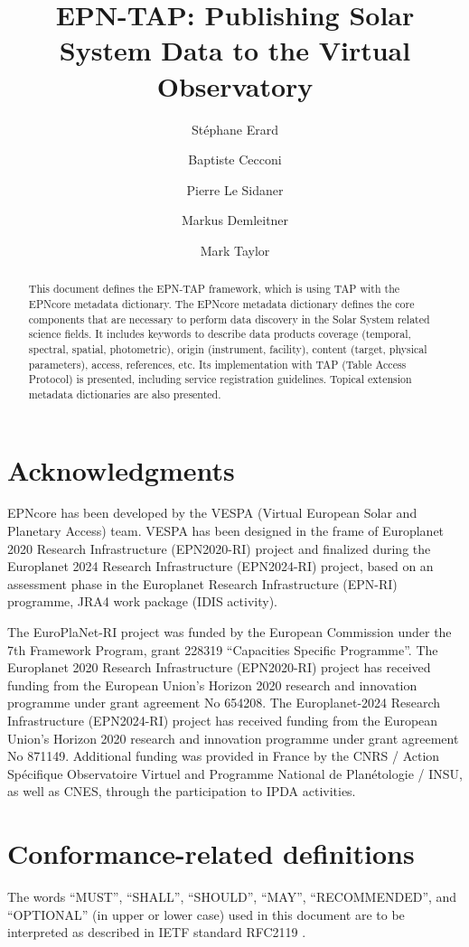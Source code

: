 \documentclass[11pt,a4paper]{ivoa}
\title{EPN-TAP: Publishing Solar System Data to the Virtual Observatory}
\author{St\'ephane Erard}
\author{Baptiste Cecconi}
\author{Pierre Le Sidaner}
\author{Markus Demleitner}
\author{Mark Taylor}
\begin{document}
\begin{abstract}
This document defines the EPN-TAP framework, which is using TAP with the EPNcore metadata dictionary. The EPNcore metadata dictionary defines the core components that are necessary 
to perform data discovery in the Solar System related science fields. It includes keywords to describe data products coverage (temporal, spectral, 
spatial, photometric), origin (instrument, facility), content (target, physical parameters), access, references, etc. Its implementation with TAP (Table Access Protocol) is presented, including service registration guidelines. Topical extension metadata dictionaries are also presented.
\end{abstract}


\section*{Acknowledgments}

EPNcore has been developed by the VESPA (Virtual European Solar and Planetary Access) team. 
VESPA has been designed in the frame of Europlanet 2020 Research Infrastructure (EPN2020-RI) project and finalized during the Europlanet 2024 Research Infrastructure (EPN2024-RI) project, based on an assessment phase in the Europlanet Research Infrastructure (EPN-RI) programme, JRA4 work package (IDIS activity).

The EuroPlaNet-RI project was funded by the European Commission under the 7th Framework Program, grant 228319 ``Capacities Specific Programme''.
The Europlanet 2020 Research Infrastructure (EPN2020-RI) project has received funding from the European Union's Horizon 2020 research and innovation programme under grant agreement No 654208. 
The Europlanet-2024 Research Infrastructure (EPN2024-RI) project has received funding from the European Union's Horizon 2020 research and innovation programme under grant agreement No 871149.
Additional funding was provided in France by the CNRS / Action Sp\'ecifique Observatoire Virtuel and Programme National de Plan\'etologie / INSU, as well as CNES, through the participation to IPDA activities.

\section*{Conformance-related definitions}

The words ``MUST'', ``SHALL'', ``SHOULD'', ``MAY'', ``RECOMMENDED'', and
``OPTIONAL'' (in upper or lower case) used in this document are to be
interpreted as described in IETF standard RFC2119 \citep{std:RFC2119}.
\end{document}
